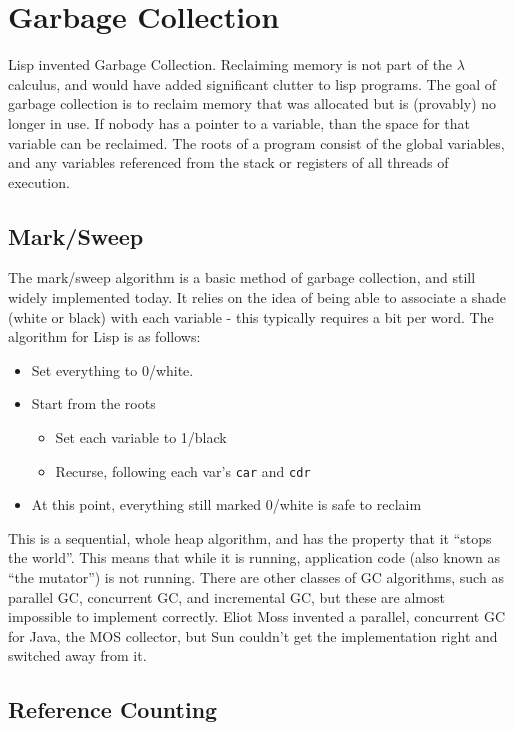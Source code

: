 \documentclass[twoside]{article}
\begin{document}
\section{Garbage Collection}

Lisp invented Garbage Collection.  Reclaiming memory is not part of
the $\lambda$ calculus, and would have added significant clutter to lisp
programs.  The goal of garbage collection is to reclaim memory that
was allocated but is (provably) no longer in use.  If nobody has a
pointer to a variable, than the space for that variable can be
reclaimed.  The roots of a program consist of the global variables,
and any variables referenced from the stack or registers of all
threads of execution.

\subsection{Mark/Sweep}

The mark/sweep algorithm is a basic method of garbage collection, and
still widely implemented today.  It relies on the idea of being able
to associate a shade (white or black) with each variable - this
typically requires a bit per word.  The algorithm for Lisp is as follows:

\begin{itemize}
  \item Set everything to 0/white.
  \item Start from the roots
    \begin{itemize}
      \item Set each variable to 1/black
      \item Recurse, following each var's \texttt{car} and \texttt{cdr}
    \end{itemize}
   \item At this point, everything still marked 0/white is safe to reclaim
\end{itemize}

This is a sequential, whole heap algorithm, and has the property that
it ``stops the world''.  This means that while it is running,
application code (also known as ``the mutator'') is not running.
There are other classes of GC algorithms, such as parallel GC,
concurrent GC, and incremental GC, but these are almost impossible to
implement correctly.  Eliot Moss invented a parallel, concurrent GC
for Java, the MOS collector, but Sun couldn't get the implementation
right and switched away from it.

\subsection{Reference Counting}
\end{document}
